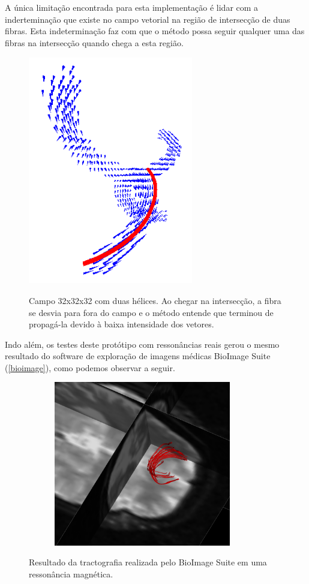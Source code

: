   A única limitação encontrada para esta implementação é lidar com a inderteminação que existe no campo vetorial na região de intersecção de duas fibras. Esta indeterminação faz com que o método possa seguir qualquer uma das fibras na intersecção quando chega a esta região.
  
  \begin{figure}[!h]
    \begin{center}
      \includegraphics[width=72mm, height=100mm]{images/fibraecampo.png}
      \label{fig:fibraecampo}
      \caption{Campo 32x32x32 com duas hélices. Ao chegar na intersecção, a fibra se desvia para fora do campo e o método entende que terminou de propagá-la devido à baixa intensidade dos vetores.}
    \end{center}
  \end{figure}
  
  Indo além, os testes deste protótipo com ressonâncias reais gerou o mesmo resultado do software de exploração de imagens médicas BioImage Suite (\ref{bioimage}), como podemos observar a seguir.
  
  \begin{figure}[!h]
    \begin{center}
      \includegraphics[width=100mm, height=72mm]{images/bioimage-dti.png}
      \label{fig:bioimage-dti}
      \caption{Resultado da tractografia realizada pelo BioImage Suite em uma ressonância magnética.}
    \end{center}
  \end{figure}
  

